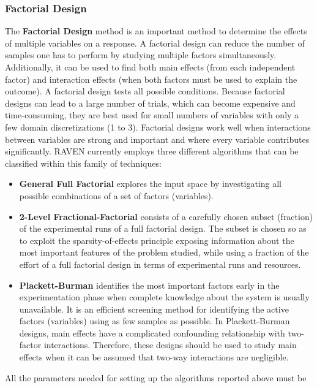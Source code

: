 \subsubsection{Factorial Design}
\label{subsubsubsec:FactorialDOE}
The \textbf{Factorial Design} method is an important method to determine the
effects of multiple variables on a response.
%
A factorial design can reduce the number of samples one has to perform by
studying multiple factors simultaneously.
%
Additionally, it can be used to find both main effects (from each independent
factor) and interaction effects (when both factors must be used to explain the
outcome).
%
A factorial design tests all possible conditions.
%
Because factorial designs can lead to a large number of trials, which can
become expensive and time-consuming, they are best used for small numbers of
variables with only a few domain discretizations (1 to 3).
%
Factorial designs work well when interactions between variables are strong and
important and where every variable contributes significantly.
%
RAVEN currently employs three different algorithms that can be classified within
this family of techniques:
\begin{itemize}
  \item \textbf{General Full Factorial} explores the input space by
    investigating all possible combinations of a set of factors (variables).
  \item \textbf{2-Level Fractional-Factorial} consists of a carefully chosen
    subset (fraction) of the experimental runs of a full factorial design.
    The subset is chosen so as to exploit the sparsity-of-effects principle
    exposing information about the most important features of the problem
    studied, while using a fraction of the effort of a full factorial design in
    terms of experimental runs and resources.
  \item \textbf{Plackett-Burman} identifies the most important factors early in
    the experimentation phase when complete knowledge about the system is
    usually unavailable.
    It is an efficient screening method for identifying the active factors
    (variables) using as few samples as possible.
    In Plackett-Burman designs, main effects have a complicated confounding
    relationship with two-factor interactions.
    Therefore, these designs should be used to study main effects when it can be
    assumed that two-way interactions are negligible.
\end{itemize}
All the parameters needed for setting up the algorithms reported above must be
